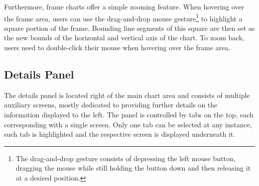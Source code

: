 Furthermore, frame charts offer a simple zooming feature. When hovering over the frame area, users can use the drag-and-drop mouse gesture\footnote{The drag-and-drop gesture consists of depressing the left mouse button, dragging the mouse while still holding the button down and then releasing it at a desired position.} to highlight a square portion of the frame. Bounding line segments of this square are then set as the new bounds of the horizontal and vertical axis of the chart. To zoom back, users need to double-click their mouse when hovering over the frame area.

\subsection{Details Panel}
The details panel is located right of the main chart area and consists of multiple auxiliary screens, mostly dedicated to providing further details on the information displayed to the left. The panel is controlled by tabs on the top, each corresponding with a single screen. Only one tab can be selected at any instance, such tab is highlighted and the respective screen is displayed underneath it.

